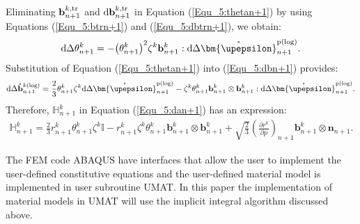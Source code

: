 Eliminating ${\mathbf{b}}_{n + 1}^{k,\rm tr}$ and ${\text{d}}{\mathbf{b}}_{n + 1}^{k,\rm tr}$ in Equation (\ref{Equ_5:thetan+1}) by using Equations (\ref{Equ_5:btrn+1}) and (\ref{Equ_5:dbtrn+1}), we obtain:
\begin{equation}
\label{Equ_5:thetan+1}
{\text{d}} \Delta \theta _{n + 1}^k =  - {\left( {\theta _{n + 1}^k} \right)^2}{\zeta ^k}{\mathbf{b}}_{n + 1}^k:{\text{d}}\Delta \mathring {\bm{\upepsilon}}_{n + 1}^{\rm p(\log) }.
\end{equation}
Substitution of Equation (\ref{Equ_5:thetan+1}) into (\ref{Equ_5:dbn+1}) provides:
\begin{equation}
\label{Equ_5:dbn+12}
\text{d} \Delta \mathring {\mathbf{b}}_{n + 1}^{k(\log) } = \frac{2}{3}\theta _{n + 1}^k{\zeta ^k}{\text{d}}\Delta \mathring {\bm{\upepsilon}}_{n + 1}^{\rm p(\log) } - {\zeta ^k}\theta _{n + 1}^k{\mathbf{b}}_{n + 1}^k \otimes {\mathbf{b}}_{n + 1}^k:{\text{d}}\Delta \mathring {\bm{\upepsilon}}_{n + 1}^{\rm p(\log) }.
\end{equation}
Therefore, $\mathbb{H}_{n + 1}^k$ in Equation (\ref{Equ_5:dan+1}) has an expression:
\begin{equation}
\begin{aligned}
\mathbb{H}_{n + 1}^k = \frac{2}{3}r_{n + 1}^k\theta _{n + 1}^k{\zeta ^k}\mathbb{I} - r_{n + 1}^k{\zeta ^k}\theta _{n + 1}^k{\mathbf{b}}_{n + 1}^k \otimes {\mathbf{b}}_{n + 1}^k + 
\sqrt {\frac{2}{3}} {\left( {\frac{{\partial {r^k}}}{{\partial p}}} \right)_{n + 1}}{\mathbf{b}}_{n + 1}^k \otimes {{\mathbf{n}}_{n + 1}}.
\end{aligned}
\end{equation}

The FEM code ABAQUS have interfaces that allow the user to implement the user-defined constitutive equations and the user-defined material model is implemented in user subroutine UMAT.
In this paper the implementation of material models in UMAT will use the implicit integral algorithm discussed above.